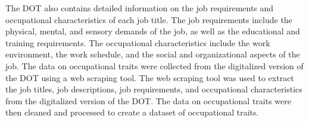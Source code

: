 \documentclass[11pt, a4paper, leqno]{article}
\begin{document}
The DOT also contains detailed information on the job requirements and occupational characteristics of each job title. The job requirements include the physical, mental, and sensory demands of the job, as well as the educational and training requirements. The occupational characteristics include the work environment, the work schedule, and the social and organizational aspects of the job. The data on occupational traits were collected from the digitalized version of the DOT using a web scraping tool. The web scraping tool was used to extract the job titles, job descriptions, job requirements, and occupational characteristics from the digitalized version of the DOT. The data on occupational traits were then cleaned and processed to create a dataset of occupational traits.













\newpage
\nocite{*}
\printbibliography
\end{document}
